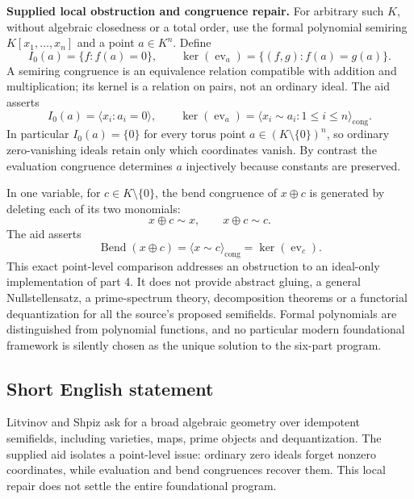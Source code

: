 \documentclass[11pt]{article}
\begin{document}
\textbf{Supplied local obstruction and congruence repair.} For arbitrary such $K$, without algebraic closedness or a total order, use the formal polynomial semiring $K[x_1,\ldots,x_n]$ and a point $a\in K^n$. Define
\[
 I_0(a)=\{f:f(a)=0\},\qquad
 \ker(\operatorname{ev}_a)=\{(f,g):f(a)=g(a)\}.
\]
A semiring congruence is an equivalence relation compatible with addition and multiplication; its kernel is a relation on pairs, not an ordinary ideal. The aid asserts
\[
 I_0(a)=\langle x_i:a_i=0\rangle,\qquad
 \ker(\operatorname{ev}_a)=\langle x_i\sim a_i:1\le i\le n\rangle_{\mathrm{cong}}.
\]
In particular $I_0(a)=\{0\}$ for every torus point $a\in(K\setminus\{0\})^n$, so ordinary zero-vanishing ideals retain only which coordinates vanish. By contrast the evaluation congruence determines $a$ injectively because constants are preserved.

In one variable, for $c\in K\setminus\{0\}$, the bend congruence of $x\oplus c$ is generated by deleting each of its two monomials:
\[
 x\oplus c\sim x,\qquad x\oplus c\sim c.
\]
The aid asserts
\[
 \operatorname{Bend}(x\oplus c)=\langle x\sim c\rangle_{\mathrm{cong}}
                          =\ker(\operatorname{ev}_c).
\]
This exact point-level comparison addresses an obstruction to an ideal-only implementation of part 4. It does not provide abstract gluing, a general Nullstellensatz, a prime-spectrum theory, decomposition theorems or a functorial dequantization for all the source's proposed semifields. Formal polynomials are distinguished from polynomial functions, and no particular modern foundational framework is silently chosen as the unique solution to the six-part program.
\subsection{Short English statement}
Litvinov and Shpiz ask for a broad algebraic geometry over idempotent semifields, including varieties, maps, prime objects and dequantization. The supplied aid isolates a point-level issue: ordinary zero ideals forget nonzero coordinates, while evaluation and bend congruences recover them. This local repair does not settle the entire foundational program.
\end{document}
